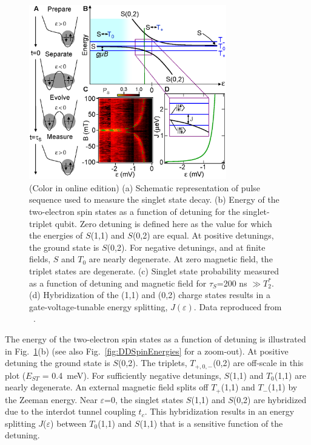 \documentclass[rmp,twocolumn,aps]{revtex4}
\begin{document}
\begin{figure}[htb]
\includegraphics[width=8.6cm]{hanson_fig46.eps}
\caption{(Color in online edition) (a) Schematic representation of pulse sequence used to
measure the singlet state decay. (b) Energy of the two-electron
spin states as a function of detuning for the singlet-triplet
qubit. Zero detuning is defined here as the value for which the energies of $S$(1,1) and $S$(0,2) are equal. At positive detunings, the ground
state is $S$(0,2). For negative detunings, and at finite fields,
$S$ and $T_{0}$ are nearly degenerate. At zero
magnetic field, the triplet states are degenerate. (c) Singlet state
probability measured as a function of detuning and magnetic field
for $\tau_S$=200 ns $\gg$$T_2^*$. (d) Hybridization of the (1,1)
and (0,2) charge states results in a gate-voltage-tunable energy
splitting, $J(\varepsilon)$. Data
reproduced from ~\textcite{petta05}.}\vspace{-0.5 cm} \label{Fig:PettaST}
\end{figure}

The energy of the two-electron spin states as a function of
detuning is illustrated in Fig.~\ref{Fig:PettaST}(b) (see also Fig.~\ref{fig:DDSpinEnergies} for a zoom-out). At
positive detuning the ground state is $S$(0,2). The triplets,
$T_{+,0,-}$(0,2) are off-scale in this plot ($E_{ST}$ = 0.4~meV). For sufficiently negative detunings, $S$(1,1) and
$T_0$(1,1) are nearly degenerate. An external magnetic field splits off
$T_+$(1,1) and $T_-$(1,1) by the Zeeman energy. Near $\varepsilon$=0,
the singlet states $S$(1,1) and $S$(0,2) are hybridized due to the
interdot tunnel coupling $t_c$. This hybridization results in an
energy splitting $J$($\varepsilon$) between $T_0$(1,1) and $S$(1,1) that
is a sensitive function of the detuning.
\end{document}
